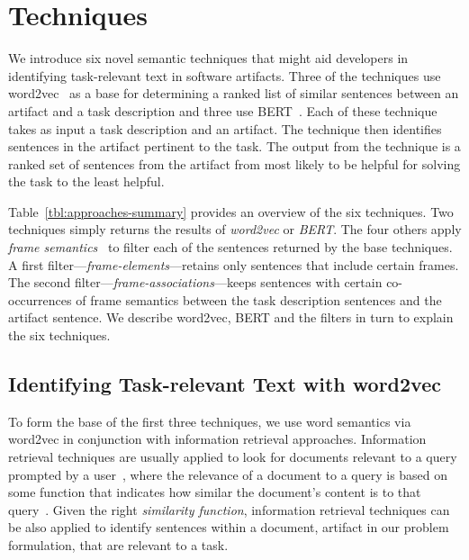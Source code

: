 \clearpage

\section{Techniques}
\label{cp5:approaches}



We introduce six novel semantic techniques that might 
aid developers in identifying
task-relevant text in software artifacts. Three of the
techniques use word2vec~\cite{Mikolov2013} as a base for determining a ranked list of similar sentences between an artifact
and a task description and three use BERT~\cite{Devlin2018Bert}.
Each of these technique takes as input
a task description and an artifact. The technique then identifies
sentences in the artifact pertinent to the task. The output
from the technique is a ranked set of sentences from
the artifact from most likely to be helpful for solving the
task to the least helpful.



Table~\ref{tbl:approaches-summary} provides an overview of the six techniques.
Two techniques simply returns the results of \textit{word2vec} or \textit{BERT}.
The four others apply \textit{frame semantics}~\cite{fillmore1976frame} to filter
 each of the sentences returned by the base techniques.
A first filter---\textit{frame-elements}---retains only sentences
that include certain frames. The second filter---\textit{frame-associations}---keeps
sentences with certain co-occurrences of 
frame semantics between the task description sentences
and the artifact sentence. We describe word2vec, BERT and the filters in turn to
explain the six techniques.






\subsection{Identifying Task-relevant Text with word2vec}
\label{cp5:approach-w2v}



To form the base of the first three techniques,  we use word semantics via word2vec in conjunction with information retrieval approaches.
Information retrieval techniques are usually applied to look for documents relevant to a query prompted by a user~\cite{Bavota2016}, where the relevance of a document to a query is based on some function that indicates how similar the document's content is to that query~\cite{Manning2009IR}. Given the right \textit{similarity function}, information retrieval  techniques 
can be also applied to identify sentences within a document, artifact in our problem formulation, that are relevant to a task.



